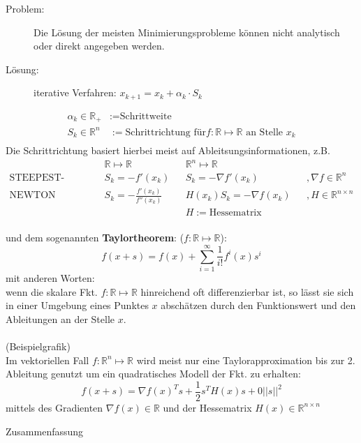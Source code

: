 \begin{description}
	\item[Problem:] Die Lösung der meisten Minimierungsprobleme können nicht analytisch oder direkt angegeben werden.
	\item[Lösung:] iterative Verfahren: $x_{k+1}=x_k + \alpha_k \cdot S_k$
\end{description}
\begin{align*}
	\alpha_k \in \mathbb{R}_+ &:= \text{Schrittweite}\\
	S_k \in \mathbb{R}^n&:= \text{Schrittrichtung für} f: \mathbb{R} \mapsto \mathbb{R} \text{ an Stelle } x_k\\
\end{align*}
Die Schrittrichtung basiert hierbei meist auf Ableitsungsinformationen, z.B.
\begin{align*}
	& \mathbb{R} \mapsto \mathbb{R} && \mathbb{R}^n \mapsto \mathbb{R}\\
	\text{STEEPEST-DESCENT } & S_k = -f'(x_k) && S_k = -\nabla f'(x_k) && ,\nabla f \in \mathbb{R}^n\\
	\text{NEWTON  } & S_k=-\frac{f'(x_k)}{f''(x_k)} && H(x_k) S_k = -\nabla f(x_k) && ,H \in \mathbb{R}^{n \times n}\\
	& && H := \text{Hessematrix}	
\end{align*}
\\
\noindent und dem sogenannten \textbf{Taylortheorem}: ($f: \mathbb{R} \mapsto \mathbb{R}$):
$$f(x+s) = f(x) + \sum_{i=1}^{\infty} \frac{1}{i!}f^i(x)s^i$$
mit anderen Worten:\\
wenn die skalare Fkt. $f: \mathbb{R} \mapsto \mathbb{R}$ hinreichend oft differenzierbar ist, so lässt sie sich in einer Umgebung eines Punktes $x$ abschätzen durch den Funktionswert und den Ableitungen an der Stelle $x$.\\
\vspace{3cm}\\
(Beispielgrafik)\\

\noindent Im vektoriellen Fall $f: \mathbb{R}^n \mapsto \mathbb{R}$ wird meist nur eine Taylorapproximation bis zur 2. Ableitung genutzt um ein quadratisches Modell der Fkt. zu erhalten:
$$f(x+s) = \nabla f(x)^Ts + \frac{1}{2} s^TH(x)s + 0||s||^2$$
mittels des Gradienten $\nabla f(x) \in \mathbb{R}$ und der Hessematrix $H(x) \in \mathbb{R}^{n \times n}$

Zusammenfassung

